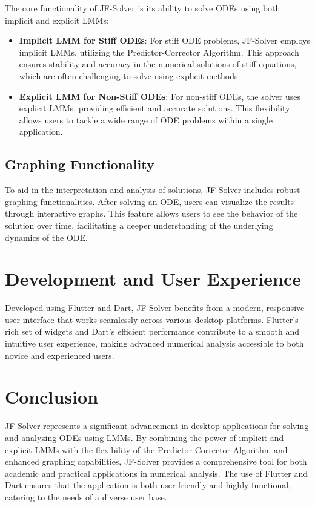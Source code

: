 The core functionality of JF-Solver is its ability to solve ODEs using both implicit and explicit LMMs:

\begin{itemize}
  \item \textbf{Implicit LMM for Stiff ODEs}: For stiff ODE problems, JF-Solver employs implicit LMMs, utilizing the Predictor-Corrector Algorithm. This approach ensures stability and accuracy in the numerical solutions of stiff equations, which are often challenging to solve using explicit methods.
  
  \item \textbf{Explicit LMM for Non-Stiff ODEs}: For non-stiff ODEs, the solver uses explicit LMMs, providing efficient and accurate solutions. This flexibility allows users to tackle a wide range of ODE problems within a single application.
\end{itemize}

\subsection{Graphing Functionality}

To aid in the interpretation and analysis of solutions, JF-Solver includes robust graphing functionalities. After solving an ODE, users can visualize the results through interactive graphs. This feature allows users to see the behavior of the solution over time, facilitating a deeper understanding of the underlying dynamics of the ODE.

\section{Development and User Experience}

Developed using Flutter and Dart, JF-Solver benefits from a modern, responsive user interface that works seamlessly across various desktop platforms. Flutter’s rich set of widgets and Dart’s efficient performance contribute to a smooth and intuitive user experience, making advanced numerical analysis accessible to both novice and experienced users.

\section{Conclusion}

JF-Solver represents a significant advancement in desktop applications for solving and analyzing ODEs using LMMs. By combining the power of implicit and explicit LMMs with the flexibility of the Predictor-Corrector Algorithm and enhanced graphing capabilities, JF-Solver provides a comprehensive tool for both academic and practical applications in numerical analysis. The use of Flutter and Dart ensures that the application is both user-friendly and highly functional, catering to the needs of a diverse user base.

